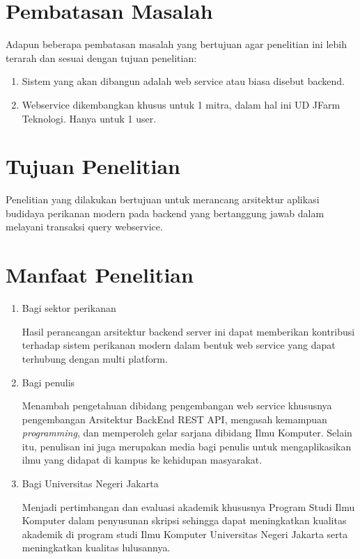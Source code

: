 \section{Pembatasan Masalah}
Adapun beberapa pembatasan masalah yang bertujuan agar penelitian ini lebih terarah dan sesuai dengan tujuan penelitian:
\begin{enumerate}
	\item Sistem yang akan dibangun adalah web service atau biasa disebut backend.
	\item Webservice dikembangkan khusus untuk 1 mitra, dalam hal ini UD JFarm Teknologi. Hanya untuk 1 user.
\end{enumerate}

\section{Tujuan Penelitian}
Penelitian yang dilakukan bertujuan untuk merancang arsitektur aplikasi budidaya perikanan modern pada backend yang bertanggung jawab dalam melayani transaksi query webservice.

\section{Manfaat Penelitian}
\begin{enumerate}
	\item Bagi sektor perikanan
	
	Hasil perancangan arsitektur backend server ini dapat memberikan kontribusi terhadap sistem perikanan modern dalam bentuk web service yang dapat terhubung dengan multi platform.
	
	\item Bagi penulis
		
	Menambah pengetahuan dibidang pengembangan web service khususnya pengembangan Arsitektur BackEnd REST API, mengasah kemampuan \emph{programming}, dan memperoleh gelar sarjana dibidang Ilmu Komputer. Selain itu, penulisan ini juga merupakan media bagi penulis untuk mengaplikasikan ilmu yang didapat di kampus ke kehidupan masyarakat.
		
	\item Bagi Universitas Negeri Jakarta 
	 	
	Menjadi pertimbangan dan evaluasi akademik khususnya Program Studi Ilmu Komputer dalam penyusunan skripsi sehingga dapat meningkatkan kualitas akademik di program studi Ilmu Komputer Universitas Negeri Jakarta serta meningkatkan kualitas lulusannya.
	 			
\end{enumerate} 


\begin{comment}

\end{comment}
